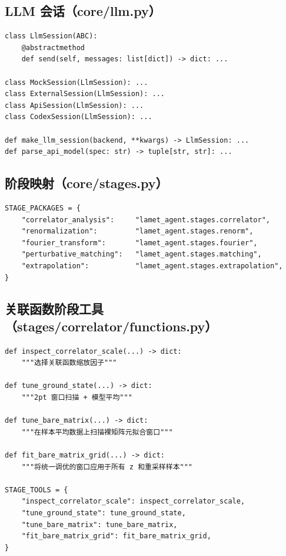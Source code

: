\documentclass[12pt,a4paper]{ctexart}
\begin{document}
\subsection{LLM 会话（core/llm.py）}

\begin{lstlisting}[style=pycode]
class LlmSession(ABC):
    @abstractmethod
    def send(self, messages: list[dict]) -> dict: ...

class MockSession(LlmSession): ...
class ExternalSession(LlmSession): ...
class ApiSession(LlmSession): ...
class CodexSession(LlmSession): ...

def make_llm_session(backend, **kwargs) -> LlmSession: ...
def parse_api_model(spec: str) -> tuple[str, str]: ...
\end{lstlisting}

\subsection{阶段映射（core/stages.py）}

\begin{lstlisting}[style=pycode]
STAGE_PACKAGES = {
    "correlator_analysis":     "lamet_agent.stages.correlator",
    "renormalization":         "lamet_agent.stages.renorm",
    "fourier_transform":       "lamet_agent.stages.fourier",
    "perturbative_matching":   "lamet_agent.stages.matching",
    "extrapolation":           "lamet_agent.stages.extrapolation",
}
\end{lstlisting}

\subsection{关联函数阶段工具（stages/correlator/functions.py）}

\begin{lstlisting}[style=pycode]
def inspect_correlator_scale(...) -> dict:
    """选择关联函数缩放因子"""

def tune_ground_state(...) -> dict:
    """2pt 窗口扫描 + 模型平均"""

def tune_bare_matrix(...) -> dict:
    """在样本平均数据上扫描裸矩阵元拟合窗口"""

def fit_bare_matrix_grid(...) -> dict:
    """将统一调优的窗口应用于所有 z 和重采样样本"""

STAGE_TOOLS = {
    "inspect_correlator_scale": inspect_correlator_scale,
    "tune_ground_state": tune_ground_state,
    "tune_bare_matrix": tune_bare_matrix,
    "fit_bare_matrix_grid": fit_bare_matrix_grid,
}
\end{lstlisting}
\end{document}
